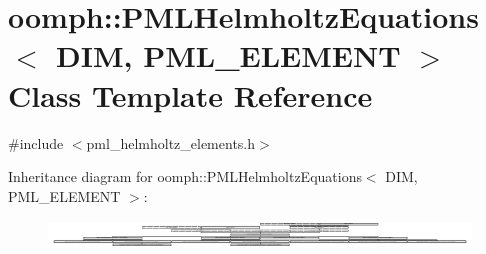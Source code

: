 \hypertarget{classoomph_1_1PMLHelmholtzEquations}{}\section{oomph\+:\+:P\+M\+L\+Helmholtz\+Equations$<$ D\+IM, P\+M\+L\+\_\+\+E\+L\+E\+M\+E\+NT $>$ Class Template Reference}
\label{classoomph_1_1PMLHelmholtzEquations}


{\ttfamily \#include $<$pml\+\_\+helmholtz\+\_\+elements.\+h$>$}

Inheritance diagram for oomph\+:\+:P\+M\+L\+Helmholtz\+Equations$<$ D\+IM, P\+M\+L\+\_\+\+E\+L\+E\+M\+E\+NT $>$\+:\begin{figure}[H]
\begin{center}
\leavevmode
\includegraphics[height=0.746667cm]{classoomph_1_1PMLHelmholtzEquations}
\end{center}
\end{figure}
